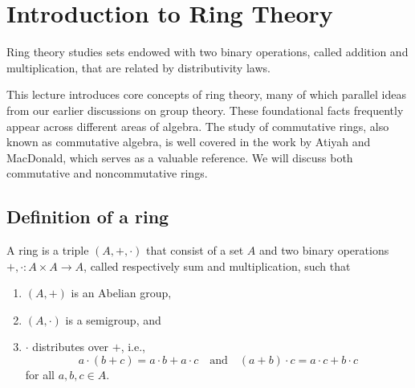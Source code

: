 \documentclass[11pt,a4paper]{article}
\begin{document}
\def\contador{Lesson 9}

\label{class:rings}

\section{Introduction to Ring Theory}

Ring theory studies sets endowed with two binary operations, called addition and multiplication, that are related by distributivity laws.

This lecture introduces core concepts of ring theory, many of which parallel ideas from our earlier discussions on group theory. These foundational facts frequently appear across different areas of  algebra. The study of commutative rings, also known as commutative algebra, is well covered in the work by Atiyah and MacDonald, which serves as a valuable reference.
We will discuss both commutative and noncommutative rings.


%

\subsection{Definition of a ring}

\begin{defi}
    A ring is a triple $(A,+,\cdot)$ that consist of a set  \(A\) and two binary operations \(+,\cdot\colon A\times A\to A\), called respectively sum and multiplication, such that 
\begin{enumerate}[label=(\roman*)]
    \item $(A,+)$ is an Abelian group,
    \item $(A,\cdot)$ is a semigroup, and
    \item \(\cdot\) distributes over \(+\), i.e., \[a \cdot (b+c) = a\cdot b + a\cdot c\quad\text{and}\quad(a+b)\cdot c= a\cdot c + b\cdot c\]
    for all \(a,b,c \in A\).
\end{enumerate}
\end{defi}
\end{document}
